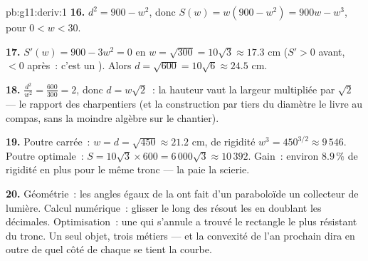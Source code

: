 \begin{solution}{pb:g11:deriv:1}
\textbf{16.} $d^2 = 900 - w^2$, donc
$S(w) = w(900 - w^2) = 900w - w^3$, pour $0 < w < 30$.

\textbf{17.} $S'(w) = 900 - 3w^2 = 0$ en
$w = \sqrt{300} = 10\sqrt3 \approx 17.3$ cm ($S' > 0$ avant,
$< 0$ après~: c'est un ). Alors
$d = \sqrt{600} = 10\sqrt6 \approx 24.5$ cm.

\textbf{18.} $\frac{d^2}{w^2} = \frac{600}{300} = 2$, donc
$d = w\sqrt2$~: la hauteur vaut la largeur multipliée par $\sqrt2$
--- le rapport des charpentiers (et la construction par tiers du
diamètre le livre au compas, sans la moindre algèbre sur le
chantier).

\textbf{19.} Poutre carrée~: $w = d = \sqrt{450} \approx 21.2$ cm,
de rigidité $w^3 = 450^{3/2} \approx 9\,546$. Poutre optimale~:
$S = 10\sqrt3 \times 600 = 6\,000\sqrt3 \approx 10\,392$. Gain~:
environ $8.9\,\%$ de rigidité en plus pour le même tronc --- la
 paie la scierie.

\textbf{20.} Géométrie~: les angles égaux de la  ont fait
d'un paraboloïde un collecteur de lumière. Calcul numérique~:
glisser le long des  résout les  en doublant les
décimales. Optimisation~: une  qui s'annule a trouvé le
rectangle le plus résistant du tronc. Un seul objet, trois métiers
--- et la convexité de l'an prochain dira en outre de quel côté de
chaque  se tient la courbe.
\end{solution}
